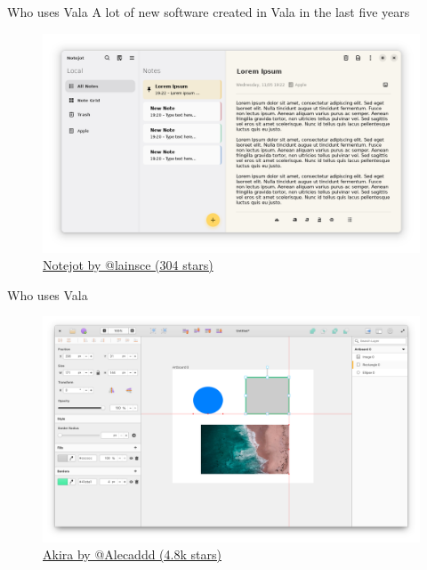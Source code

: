 \documentclass[t]{beamer}
\begin{document}
\begin{frame}[c]{Who uses Vala}
A lot of new software created in Vala in the last five years
\begin{figure}
    \begin{center}
        \includegraphics[scale=.23]{res/notejot.png}
        \caption{\href{https://github.com/lainsce/notejot}{Notejot by @lainsce (304 stars)}}
    \end{center}
\end{figure}
\end{frame}

\begin{frame}[c]{Who uses Vala}
\begin{figure}
    \begin{center}
        \includegraphics[scale=.205]{res/akira.png}
        \caption{\href{https://github.com/akiraux/akira}{Akira by @Alecaddd (4.8k stars)}}
    \end{center}
\end{figure}
\end{frame}
\end{document}
